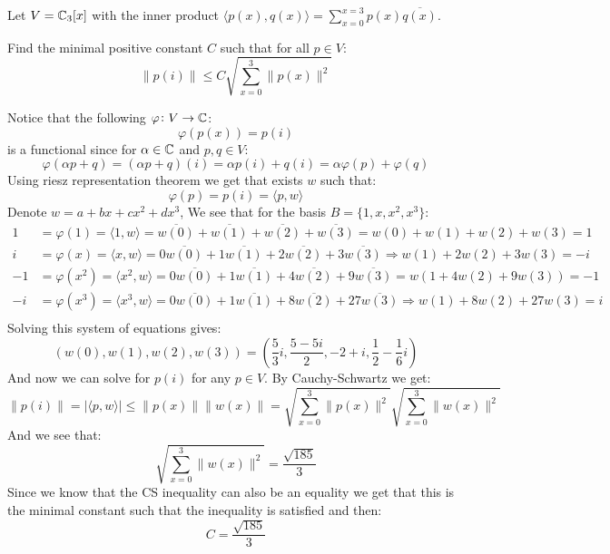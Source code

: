 \documentclass[11pt, a4paper]{article}
\begin{document}
\begin{exercise}
  Let $V=\mathbb{C}_3[x]$ with the inner product 
  $\langle p(x),q(x)\rangle = \sum_{x=0}^{x=3}{p(x)\overline{q(x)}}$.
  
  Find the minimal positive constant $C$ such that 
  for all $p\in V$:
  \[
  \| p(i) \| \le
  C\sqrt{\sum_{x=0}^{3}{\| p(x) \|^2}}
  \]
\end{exercise}
\begin{solution}
  Notice that the following $\varphi \colon V \to \mathbb{C}$:
  \[
    \varphi(p(x)) = p(i)
  \]
  is a functional since for $\alpha\in\mathbb{C}$ and $p,q\in V$:
  \[
    \varphi(\alpha p + q) = (\alpha p + q)(i) = \alpha p(i) + q(i) = 
    \alpha \varphi(p) + \varphi(q)
  \]
  Using riesz representation theorem we get that exists $w$ such that:
  \[
    \varphi(p) = p(i) = \langle p, w\rangle
  \]
  Denote $w = a+bx+cx^2+dx^3$, 
  We see that for the basis $B = \{1,x,x^2,x^3\}$:
  \begin{align*}
    1 &= \varphi(1) = \langle 1, w\rangle = \overline{w(0)} + 
    \overline{w(1)} + \overline{w(2)} + \overline{w(3)} 
    = {w(0)} + {w(1)} + {w(2)} + {w(3)} = 1 \\
    i &= \varphi(x) = \langle x, w\rangle = 0\overline{w(0)} + 
    1\overline{w(1)} + 2\overline{w(2)} + 3\overline{w(3)} 
    \Rightarrow w(1)+2w(2)+3w(3) = -i \\
    -1 &= \varphi(x^2) = \langle x^2, w\rangle = 0\overline{w(0)} + 
    1\overline{w(1)} + 4\overline{w(2)} + 9\overline{w(3)} = 
    w(1 + 4w(2) + 9w(3)) = -1 \\
    -i &= \varphi(x^3) = \langle x^3, w\rangle = 0\overline{w(0)} + 
    1\overline{w(1)} + 8\overline{w(2)} + 27\overline{w(3)} \Rightarrow
    w(1) + 8w(2) + 27w(3) = i \\
  \end{align*}
  Solving this system of equations gives:
  \[
    (w(0),w(1),w(2),w(3)) = 
    \left(\frac{5}{3}i,\frac{5-5i}{2},-2+i,\frac{1}{2}-
    \frac{1}{6}i\right)
  \]
  And now we can solve for $p(i)$ for any $p\in V$. By Cauchy-Schwartz we get:
  \[
    \|p(i)\| = |\langle p,w\rangle| \le \|p(x)\|\|w(x)\| = 
    \sqrt{\sum_{x=0}^{3}{\| p(x) \|^2}} \sqrt{\sum_{x=0}^{3}{\| w(x) \|^2}}
  \]
  And we see that:
  \[
    \sqrt{\sum_{x=0}^{3}{\| w(x) \|^2}} = \frac{\sqrt{185}}{3}
  \]
  Since we know that the CS inequality can also be an equality we get that
  this is the minimal constant such that the inequality is satisfied and then:
  \[
    C = \frac{\sqrt{185}}{3}
  \]
\end{solution}
\end{document}

